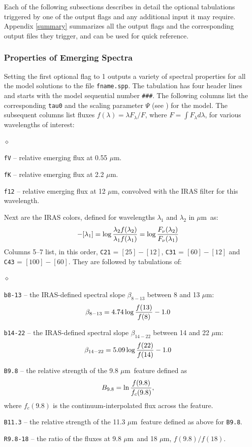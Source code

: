\documentclass[11pt]{article}
\def\eq#1{\begin{equation} #1 \end{equation}}
\def\mic    {\hbox{$\mu$m}}
\begin{document}
Each of the following subsections describes in detail the optional tabulations
triggered by one of the output flags and any additional input it may require.
Appendix \ref{summary} summarizes all the output flags and the corresponding
output files they trigger, and can be used for quick reference.


\subsubsection{Properties of Emerging Spectra}
\label{fname.spp}

Setting the first optional flag to 1 outputs a variety of spectral properties
for all the model solutions to the file {\tt fname.spp}. The tabulation has
four header lines and starts with the model sequential number {\tt \#\#\#}. The
following columns list the corresponding {\tt tau0} and the scaling parameter
$\Psi$ (see \cite{IE97}) for the model. The subsequent columns list fluxes
$f(\lambda) = \lambda F_\lambda/F$, where $F = \int\!F_\lambda d\lambda$, for
various wavelengths of interest:
\begin{list}{$\diamond$}{}
\item {\tt fV} -- relative emerging flux at 0.55 \mic.
\item {\tt fK} -- relative emerging flux at 2.2 \mic.
\item {\tt f12} -- relative emerging flux at 12 \mic, convolved with the IRAS
    filter for this wavelength.
\end{list}
Next are the IRAS colors, defined for wavelengths $\lambda_1$ and $\lambda_2$
in \mic\ as:
\eq{
  [\lambda_2] - [\lambda_1]
  =  \log{\lambda_2 f(\lambda_2) \over \lambda_1 f(\lambda_1)}
  =  \log{F_\nu(\lambda_2) \over F_\nu(\lambda_1)}
}
Columns 5--7 list, in this order, {\tt C21} = $[25] - [12]$, {\tt C31} = $[60]
- [12]$ and {\tt C43} = $[100] - [60]$. They are followed by tabulations of:

\begin{list}{$\diamond$}{}
\item{\tt b8-13} -- the IRAS-defined spectral slope $\beta_{8-13}$ between 8
    and 13 \mic:
$$
    \beta_{8-13} = 4.74\log{f(13) \over f(8)} - 1.0
$$
\item{\tt b14-22} -- the IRAS-defined spectral slope $\beta_{14-22}$ between 14
    and 22 \mic:
$$
    \beta_{14-22} = 5.09\log{f(22) \over f(14)} - 1.0
$$
\item {\tt B9.8} -- the relative strength of the 9.8 \mic\ feature defined as
$$
    B_{9.8} = \ln{f(9.8) \over f_c(9.8)},
$$
where $f_c(9.8)$ is the continuum-interpolated flux across the feature.
\item {\tt B11.3} -- the relative strength of the 11.3 \mic\ feature defined as
    above for {\tt B9.8}.
\item{\tt R9.8-18} -- the ratio of the fluxes at 9.8 \mic\ and 18 \mic,
    $f(9.8)/f(18)$.

\end{list}
\end{document}

